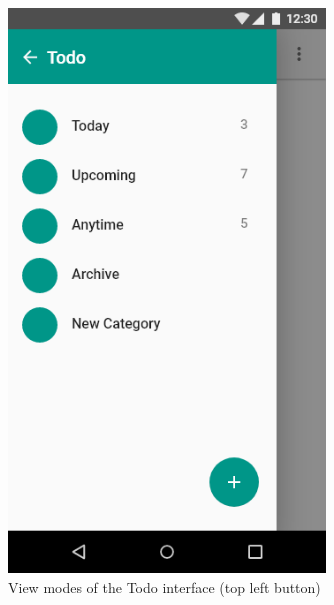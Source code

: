 \documentclass[a4paper,11pt]{article} %
\begin{document}
\begin{figure}[h!]
  \centering
  \includegraphics[width=0.75\textwidth]{img/ui-wireframe/Todo-View.png}
  \caption{View modes of the Todo interface (top left button)}
\end{figure}
\end{document}
